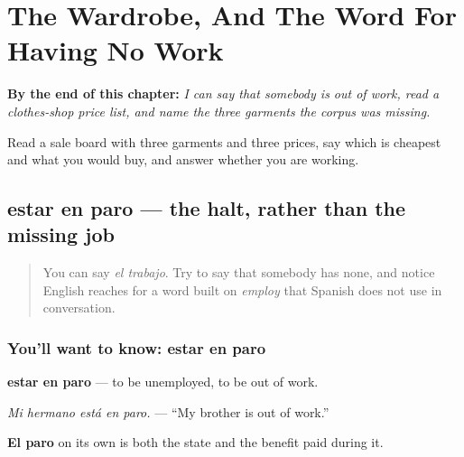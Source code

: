 
\chapter{The Wardrobe, And The Word For Having No Work}
\label{ch:paro-y-ropa}

\begin{chapteropening}
\textbf{By the end of this chapter:} \emph{I can say that somebody is out of work, read a clothes-shop price list, and name the three garments the corpus was missing.}

Read a sale board with three garments and three prices, say which is cheapest and what you would buy, and answer whether you are working.
\end{chapteropening}

\section[estar en paro]{estar en paro — the halt, rather than the missing job}

\label{lesson:ES-C430-estar-en-paro}



\begin{quote}
You can say \emph{el trabajo}. Try to say that somebody has none, and notice English reaches for a word built on \emph{employ} that Spanish does not use in conversation.
\end{quote}

\subsection*{You'll want to know: estar en paro}
\textbf{estar en paro} — to be unemployed, to be out of work.

\emph{Mi hermano está en paro.} — \textquotedblleft{}My brother is out of work.\textquotedblright{}

\textbf{El paro} on its own is both the state and the benefit paid during it.

